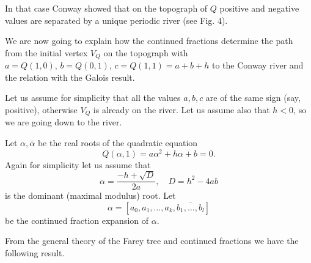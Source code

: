 \documentclass[11pt,reqno]{amsart}
\begin{document}
In that case Conway \cite{Conway} showed that on the topograph of $Q$ positive and negative values are separated by a unique periodic river
(see Fig. 4). 



We are now going to explain how the continued fractions determine the path from the initial vertex $V_Q$ on the topograph with $a=Q(1,0),\, b=Q(0,1),\,c=Q(1,1)=a+b+h$ to the Conway river and the relation with the Galois result.


Let us assume for simplicity that all the values $a,b,c$ are of the same sign (say, positive), otherwise $V_Q$ is already on the river. Let us assume also that $h<0$, so we are going down to the river.

Let $\alpha, \bar\alpha$ be the real roots of the quadratic equation
\begin{equation} \label{eq:root}
Q(\alpha, 1) = a \alpha^2+h \alpha + b=0.
\end{equation}
Again for simplicity let us assume that
$$
\alpha= \frac{-h + \sqrt{D}}{2a}, \quad D=h^2-4ab
$$
is the dominant (maximal modulus) root.
Let 
\begin{equation} \label{eq:alphaexp}
\alpha = [a_0, a_1, \ldots, a_k, \overline{b_1, \ldots, b_l}]
\end{equation}
be the continued fraction expansion of $\alpha.$ 

From the general theory of the Farey tree and continued fractions we have the following result.
\end{document}
